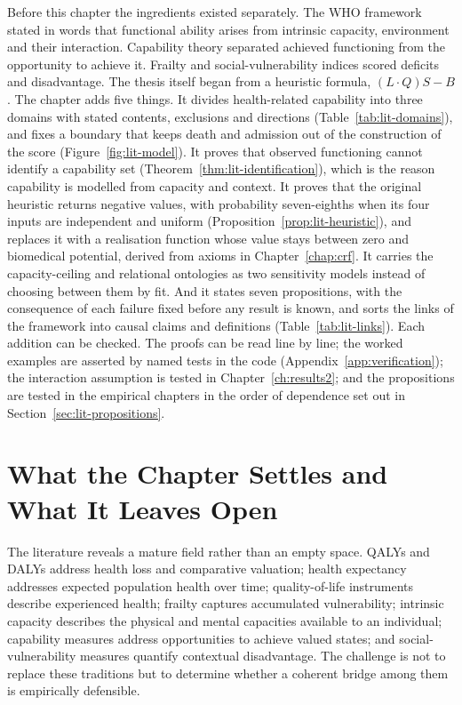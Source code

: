 Before this chapter the ingredients existed separately. The WHO framework stated in words that functional ability arises from intrinsic capacity, environment and their interaction. Capability theory separated achieved functioning from the opportunity to achieve it. Frailty and social-vulnerability indices scored deficits and disadvantage. The thesis itself began from a heuristic formula, $(L\cdot Q)S-B$. The chapter adds five things. It divides health-related capability into three domains with stated contents, exclusions and directions (Table~\ref{tab:lit-domains}), and fixes a boundary that keeps death and admission out of the construction of the score (Figure~\ref{fig:lit-model}). It proves that observed functioning cannot identify a capability set (Theorem~\ref{thm:lit-identification}), which is the reason capability is modelled from capacity and context. It proves that the original heuristic returns negative values, with probability seven-eighths when its four inputs are independent and uniform (Proposition~\ref{prop:lit-heuristic}), and replaces it with a realisation function whose value stays between zero and biomedical potential, derived from axioms in Chapter~\ref{chap:crf}. It carries the capacity-ceiling and relational ontologies as two sensitivity models instead of choosing between them by fit. And it states seven propositions, with the consequence of each failure fixed before any result is known, and sorts the links of the framework into causal claims and definitions (Table~\ref{tab:lit-links}). Each addition can be checked. The proofs can be read line by line; the worked examples are asserted by named tests in the code (Appendix~\ref{app:verification}); the interaction assumption is tested in Chapter~\ref{ch:results2}; and the propositions are tested in the empirical chapters in the order of dependence set out in Section~\ref{sec:lit-propositions}.

\section{What the Chapter Settles and What It Leaves Open}
\label{sec:lit-close}

The literature reveals a mature field rather than an empty space. QALYs and DALYs address health loss and comparative valuation; health expectancy addresses expected population health over time; quality-of-life instruments describe experienced health; frailty captures accumulated vulnerability; intrinsic capacity describes the physical and mental capacities available to an individual; capability measures address opportunities to achieve valued states; and social-vulnerability measures quantify contextual disadvantage. The challenge is not to replace these traditions but to determine whether a coherent bridge among them is empirically defensible.

